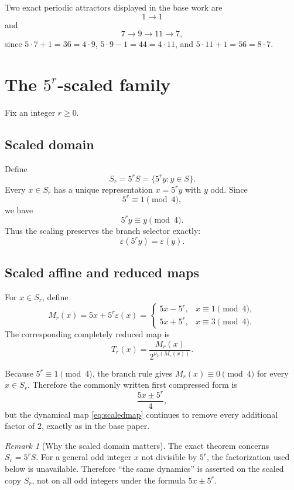 \documentclass[11pt]{article}
\theoremstyle{remark}
\newtheorem{remark}[theorem]{Remark}
\newcommand{\vTwo}{\nu_2}
\newcommand{\eps}{\varepsilon}
\begin{document}
Two exact periodic attractors displayed in the base work are
\[
1\to1
\]
and
\[
7\to9\to11\to7,
\]
since $5\cdot7+1=36=4\cdot9$, $5\cdot9-1=44=4\cdot11$, and $5\cdot11+1=56=8\cdot7$.

\section{The $5^r$-scaled family}

Fix an integer $r\ge0$.

\subsection{Scaled domain}

Define
\begin{equation}
S_r=5^rS=\{5^r y:y\in S\}.
\label{eq:domain}
\end{equation}
Every $x\in S_r$ has a unique representation $x=5^r y$ with $y$ odd.  Since
\[
5^r\equiv1\pmod4,
\]
we have
\begin{equation}
5^r y\equiv y\pmod4.
\label{eq:residuepreserve}
\end{equation}
Thus the scaling preserves the branch selector exactly:
\[
\eps(5^r y)=\eps(y).
\]

\subsection{Scaled affine and reduced maps}

For $x\in S_r$, define
\begin{equation}
M_r(x)=5x+5^r\eps(x)
=
\begin{cases}
5x-5^r,&x\equiv1\pmod4,\\
5x+5^r,&x\equiv3\pmod4.
\end{cases}
\label{eq:scaledaffine}
\end{equation}
The corresponding completely reduced map is
\begin{equation}
T_r(x)=\frac{M_r(x)}{2^{\vTwo(M_r(x))}}.
\label{eq:scaledmap}
\end{equation}

Because $5^r\equiv1\pmod4$, the branch rule gives $M_r(x)\equiv0\pmod4$ for every $x\in S_r$.  Therefore the commonly written first compressed form is
\[
\frac{5x\pm5^r}{4},
\]
but the dynamical map \eqref{eq:scaledmap} continues to remove every additional factor of $2$, exactly as in the base paper.

\begin{remark}[Why the scaled domain matters]
The exact theorem concerns $S_r=5^rS$.  For a general odd integer $x$ not divisible by $5^r$, the factorization used below is unavailable.  Therefore ``the same dynamics'' is asserted on the scaled copy $S_r$, not on all odd integers under the formula $5x\pm5^r$.
\end{remark}
\end{document}
